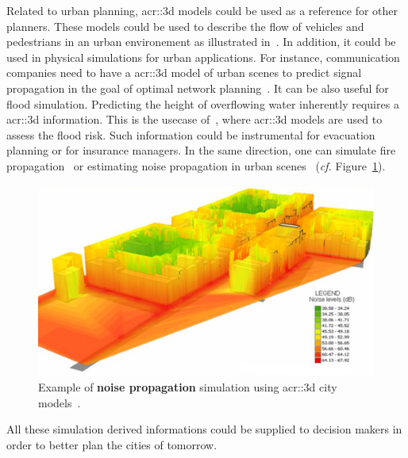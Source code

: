             Related to urban planning, \gls{acr::3d} models could be used as a reference for other planners.
            These models could be used to describe the flow of vehicles and pedestrians in an urban environement as illustrated in~\textcite{vanhoey2017varcity}.
            In addition, it could be used in physical simulations for urban applications.
            For instance, communication companies need to have a \gls{acr::3d} model of urban scenes to predict signal propagation in the goal of optimal network planning~\parencite{yun2007radio}.
            It can be also useful for flood simulation.
            Predicting the height of overflowing water inherently requires a \gls{acr::3d} information.
            This is the usecase of~\textcite{varduhn2015multi}, where \gls{acr::3d} models are used to assess the flood risk.
            Such information could be instrumental for evacuation planning or for insurance managers.
            In the same direction, one can simulate fire propagation~\parencite{dimitropoulos2010fire} or estimating noise propagation in urban scenes~\parencite{stoter20083d} (\textit{cf.} Figure~\ref{fig::noise_propogation}).
            \begin{figure}[htpb]
                \centering
                \includegraphics[width=\textwidth]{images/introduction/3d_model_applications/noise_simulation}
                \caption{
                    \label{fig::noise_propogation} Example of \textbf{noise propagation} simulation using \gls{acr::3d} city models~\parencite{kurakula2007gis}.
                }
            \end{figure}
            All these simulation derived informations could be supplied to decision makers in order to better plan the cities of tomorrow.

